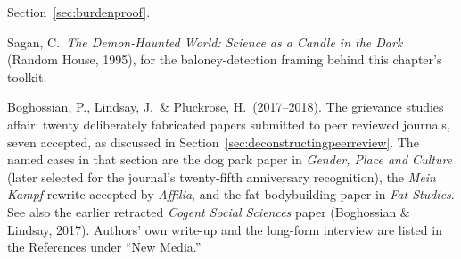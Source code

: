 \begin{srcnotes}
Section~\ref{sec:burdenproof}.
\item Sagan, C.\ \emph{The Demon-Haunted World: Science as a Candle in the Dark} (Random House,
1995), for the baloney-detection framing behind this chapter's toolkit.
\item Boghossian, P., Lindsay, J.\ \& Pluckrose, H.\ (2017--2018). The grievance studies affair:
twenty deliberately fabricated papers submitted to peer reviewed journals, seven accepted, as
discussed in Section~\ref{sec:deconstructingpeerreview}. The named cases in that section are the
dog park paper in \emph{Gender, Place and Culture} (later selected for the journal's twenty-fifth
anniversary recognition), the \emph{Mein Kampf} rewrite accepted by \emph{Affilia}, and the fat
bodybuilding paper in \emph{Fat Studies}. See also the earlier retracted \emph{Cogent Social
Sciences} paper (Boghossian \& Lindsay, 2017). Authors' own write-up and the long-form interview
are listed in the References under ``New Media.''
\end{srcnotes}
